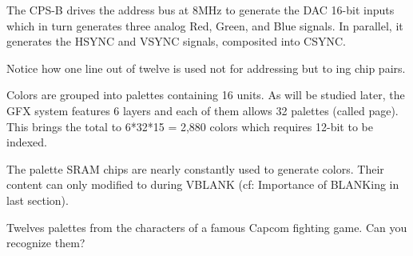 



The CPS-B drives the address bus at 8MHz to generate the DAC 16-bit inputs which in turn generates three analog Red, Green, and Blue signals. In parallel, it generates the HSYNC and VSYNC signals, composited into CSYNC.

Notice how one line out of twelve is used not for addressing but to ing chip pairs. 








Colors are grouped into palettes containing 16 units. As will be studied later, the GFX system features 6 layers and each of them allows 32 palettes (called page). This brings the total to 6*32*15 = 2,880 colors which requires 12-bit to be indexed.


 The palette SRAM chips are nearly constantly used to generate colors. Their content can only modified to during VBLANK (cf: Importance of BLANKing in last section). 



 




\pagebreak




Twelves palettes from the characters of a famous Capcom fighting game. Can you recognize them?







